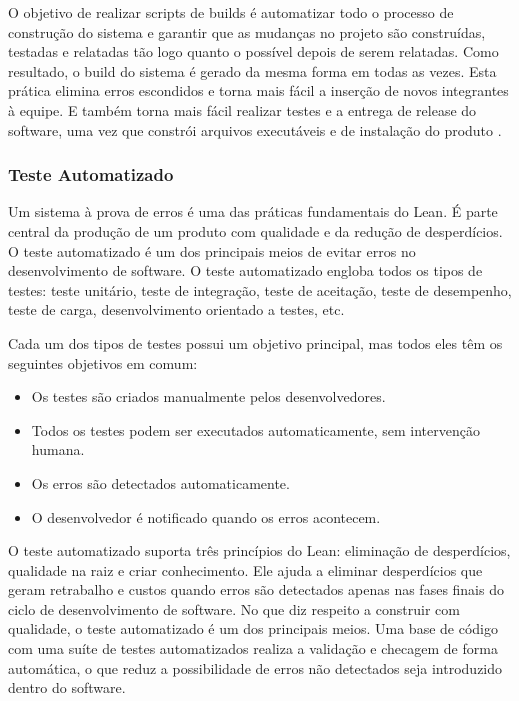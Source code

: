 O objetivo de realizar scripts de builds é automatizar todo o processo de construção do sistema e garantir que as mudanças no projeto são construídas, testadas e relatadas tão logo quanto o possível depois de serem relatadas. Como resultado, o build do sistema é gerado da mesma forma em todas as vezes. Esta prática elimina erros escondidos e torna mais fácil a inserção de novos integrantes à equipe. E também torna mais fácil realizar testes e a entrega de release do software, uma vez que constrói arquivos executáveis e de instalação do produto \cite{hibbs2009}.

\subsubsection[Teste Automatizado]{Teste Automatizado}

Um sistema à prova de erros é uma das práticas fundamentais do Lean. É parte central da produção de um produto com qualidade e da redução de desperdícios. O teste automatizado é um dos principais meios de evitar erros no desenvolvimento de software. O teste automatizado engloba todos os tipos de testes: teste unitário, teste de integração, teste de aceitação, teste de desempenho, teste de carga, desenvolvimento orientado a testes, etc.

Cada um dos tipos de testes possui um objetivo principal, mas todos eles têm os seguintes objetivos em comum:
\begin{itemize}
\item Os testes são criados manualmente pelos desenvolvedores.
\item Todos os testes podem ser executados automaticamente, sem intervenção humana.
\item Os erros são detectados automaticamente.
\item O desenvolvedor é notificado quando os erros acontecem.
\end{itemize}

O teste automatizado suporta três princípios do Lean: eliminação de desperdícios, qualidade na raiz e criar conhecimento. Ele ajuda a eliminar desperdícios que geram retrabalho e custos quando erros são detectados apenas nas fases finais do ciclo de desenvolvimento de software. No que diz respeito a construir com qualidade, o teste automatizado é um dos principais meios. Uma base de código com uma suíte de testes automatizados realiza a validação e checagem de forma automática, o que reduz a possibilidade de erros não detectados seja introduzido dentro do software.

